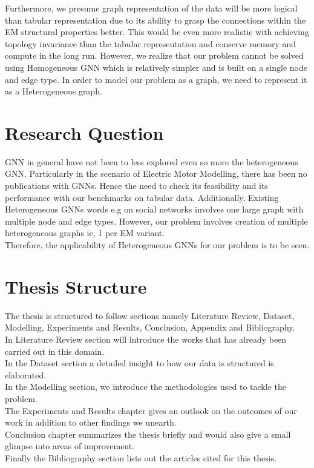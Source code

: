 \documentclass{report} %
\begin{document}
Furthermore, we presume graph representation of the data will be more logical than tabular representation due to its ability to grasp the connections within the \ac{EM} structural properties better.
This would be even more realistic with achieving topology invariance than the tabular representation and conserve memory and compute in the long run.
However, we realize that our problem cannot be solved using Homogeneous \ac{GNN} which is relatively simpler and is built on a single node and edge type.
In order to model our problem as a graph, we need to represent it as a Heterogeneous graph. \\

\section{Research Question}\label{sec:Research Question}
\ac{GNN} in general have not been to less explored even so more the heterogeneous \ac{GNN}.
Particularly in the scenario of Electric Motor Modelling, there has been no publications with \ac{GNN}s.
Hence the need to check its feasibility and its performance with our benchmarks on tabular data.
Additionally, Existing Heterogeneous \ac{GNN}s words e.g on social networks involves one large graph with multiple node and edge types. 
However, our problem involves creation of multiple heterogeneous graphs ie, 1 per \ac{EM} variant.\\
Therefore, the applicability of Heterogeneous \ac{GNN}s for our problem is to be seen.\\

\section{Thesis Structure}\label{sec:Thesis Structure}

The thesis is structured to follow sections namely Literature Review, Dataset, Modelling, Experiments and Results, Conclusion, Appendix and Bibliography.\\
In Literature Review section will introduce the works that has already been carried out in this domain. \\
In the Dataset section a detailed insight to how our data is structured is elaborated.\\
In the Modelling section, we introduce the methodologies used to tackle the problem. \\
The Experiments and Results chapter gives an outlook on the outcomes of our work in addition to other findings we unearth.\\ 
Conclusion chapter summarizes the thesis briefly and would also give a small glimpse into areas of improvement. \\
Finally the Bibliography section lists out the articles cited for this thesis.\\
\newpage 
\end{document}
